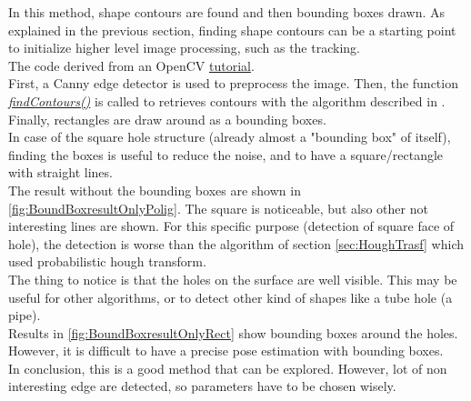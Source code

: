 In this method, shape contours are found and then bounding boxes drawn. As explained in the previous section, finding shape contours can be a starting point to initialize higher level image processing, such as the tracking.\\
The code derived from an OpenCV \href{https://docs.opencv.org/3.4.6/de/d62/tutorial_bounding_rotated_ellipses.html}{tutorial}.\\
First, a Canny edge detector is used to preprocess the image. Then, the function \href{https://docs.opencv.org/3.4.6/d3/dc0/group__imgproc__shape.html#ga17ed9f5d79ae97bd4c7cf18403e1689a}{\textit{findContours()}} is called to retrieves contours with the algorithm described in \cite{findcountors}. Finally, rectangles are draw around as a bounding boxes.\\
In case of the square hole structure (already almost a "bounding box" of itself), finding the boxes is useful to reduce the noise, and to have a square/rectangle with straight lines.\\
The result without the bounding boxes are shown in \ref{fig:BoundBoxresultOnlyPolig}. The square is noticeable, but also other not interesting lines are shown. 
For this specific purpose (detection of square face of hole), the detection is worse than the algorithm of section \ref{sec:HoughTrasf} which used probabilistic hough transform.\\
The thing to notice is that the holes on the surface are well visible. This may be useful for other algorithms, or to detect other kind of shapes like a tube hole (a pipe).\\
Results in \ref{fig:BoundBoxresultOnlyRect} show bounding boxes around the holes. However, it is difficult to have a precise pose estimation with bounding boxes.\\
In conclusion, this is a good method that can be explored.
However, lot of non interesting edge are detected, so parameters have to be chosen wisely.


